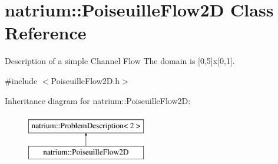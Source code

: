 \hypertarget{classnatrium_1_1PoiseuilleFlow2D}{\section{natrium\-:\-:Poiseuille\-Flow2\-D Class Reference}
\label{classnatrium_1_1PoiseuilleFlow2D}
}


Description of a simple Channel Flow The domain is \mbox{[}0,5\mbox{]}x\mbox{[}0,1\mbox{]}.  




{\ttfamily \#include $<$Poiseuille\-Flow2\-D.\-h$>$}

Inheritance diagram for natrium\-:\-:Poiseuille\-Flow2\-D\-:\begin{figure}[H]
\begin{center}
\leavevmode
\includegraphics[height=2.000000cm]{classnatrium_1_1PoiseuilleFlow2D}
\end{center}
\end{figure}
